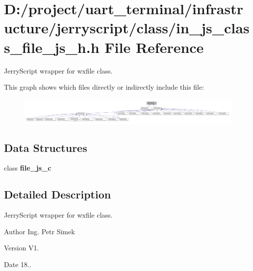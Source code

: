 \section{D\+:/project/uart\+\_\+terminal/infrastructure/jerryscript/class/in\+\_\+js\+\_\+class\+\_\+file\+\_\+js\+\_\+h.h File Reference}
\label{in__js__class__file__js__h_8h}


Jerry\+Script wrapper for wxfile class.  


This graph shows which files directly or indirectly include this file\+:
\nopagebreak
\begin{figure}[H]
\begin{center}
\leavevmode
\includegraphics[width=350pt]{in__js__class__file__js__h_8h__dep__incl}
\end{center}
\end{figure}
\subsection*{Data Structures}
\begin{DoxyCompactItemize}
\item 
class \textbf{ file\+\_\+js\+\_\+c}
\end{DoxyCompactItemize}


\subsection{Detailed Description}
Jerry\+Script wrapper for wxfile class. 

\begin{DoxyAuthor}{Author}
Ing. Petr Simek 
\end{DoxyAuthor}
\begin{DoxyVersion}{Version}
V1. 
\end{DoxyVersion}
\begin{DoxyDate}{Date}
18.. 
\end{DoxyDate}
